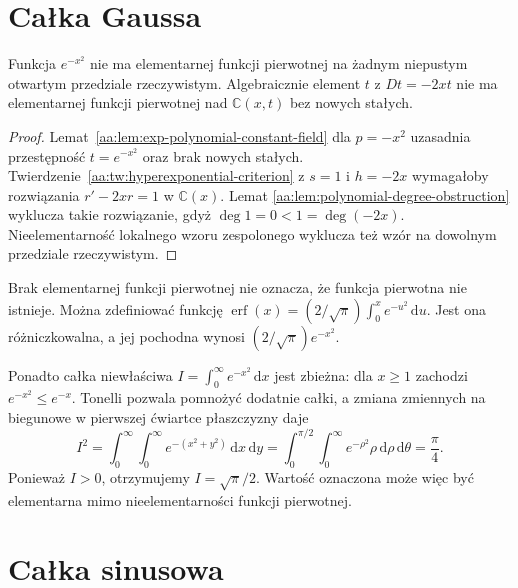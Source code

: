 \section{Całka Gaussa}

\begin{twierdzenie}
\label{aa:tw:gaussian-nonelementary}
Funkcja $e^{-x^2}$ nie ma elementarnej
funkcji pierwotnej na żadnym niepustym
otwartym przedziale rzeczywistym.
Algebraicznie element $t$ z $Dt=-2xt$
nie ma elementarnej funkcji pierwotnej
nad $\mathbb C(x,t)$ bez nowych stałych.
\end{twierdzenie}
\begin{proof}
Lemat~\ref{aa:lem:exp-polynomial-constant-field}
dla $p=-x^2$ uzasadnia przestępność
$t=e^{-x^2}$ oraz brak nowych stałych.
Twierdzenie~\ref{aa:tw:hyperexponential-criterion}
z $s=1$ i $h=-2x$ wymagałoby
rozwiązania $r'-2xr=1$
w $\mathbb C(x)$. Lemat
\ref{aa:lem:polynomial-degree-obstruction}
wyklucza takie rozwiązanie, gdyż
$\deg 1=0<1=\deg(-2x)$.
Nieelementarność lokalnego wzoru
zespolonego wyklucza też wzór
na dowolnym przedziale rzeczywistym.
\end{proof}

\begin{przyklad}
\label{aa:prz:gaussian-erf-value}
Brak elementarnej funkcji pierwotnej nie oznacza,
że funkcja pierwotna nie istnieje.
Można zdefiniować funkcję
$\operatorname{erf}(x)=
(2/\sqrt{\pi})\int_0^x e^{-u^2}\,\mathrm du$.
Jest ona różniczkowalna, a jej pochodna
wynosi $(2/\sqrt{\pi})e^{-x^2}$.

Ponadto całka niewłaściwa
$I=\int_0^\infty e^{-x^2}\,\mathrm dx$
jest zbieżna: dla $x\ge1$ zachodzi
$e^{-x^2}\le e^{-x}$. Tonelli pozwala
pomnożyć dodatnie całki, a zmiana
zmiennych na biegunowe w pierwszej
ćwiartce płaszczyzny daje
\[
 I^2=\int_0^\infty\int_0^\infty
 e^{-(x^2+y^2)}\,\mathrm dx\,\mathrm dy
 =\int_0^{\pi/2}\int_0^\infty
 e^{-\rho^2}\rho\,\mathrm d\rho\,\mathrm d\theta
 =\frac{\pi}{4}.
\]
Ponieważ $I>0$, otrzymujemy
$I=\sqrt{\pi}/2$. Wartość oznaczona
może więc być elementarna mimo
nieelementarności funkcji pierwotnej.
\end{przyklad}

\section{Całka sinusowa}

